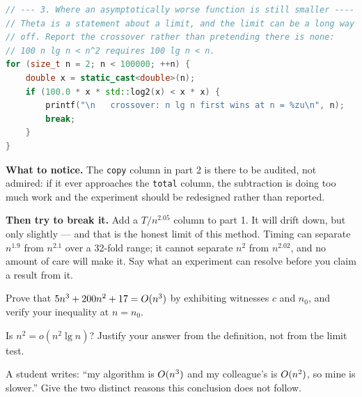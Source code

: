 \begin{lab}
\begin{lstlisting}[language=C++]
// --- 3. Where an asymptotically worse function is still smaller ----
// Theta is a statement about a limit, and the limit can be a long way
// off. Report the crossover rather than pretending there is none:
// 100 n lg n < n^2 requires 100 lg n < n.
for (size_t n = 2; n < 100000; ++n) {
    double x = static_cast<double>(n);
    if (100.0 * x * std::log2(x) < x * x) {
        printf("\n   crossover: n lg n first wins at n = %zu\n", n);
        break;
    }
}
\end{lstlisting}

\textbf{What to notice.} The \texttt{copy} column in part 2 is there to be
audited, not admired: if it ever approaches the \texttt{total} column, the
subtraction is doing too much work and the experiment should be redesigned
rather than reported.

\smallskip
\textbf{Then try to break it.} Add a $T/n^{2.05}$ column to part 1. It will
drift down, but only slightly --- and that is the honest limit of this method.
Timing can separate $n^{1.9}$ from $n^{2.1}$ over a 32-fold range; it cannot
separate $n^{2}$ from $n^{2.02}$, and no amount of care will make it. Say what
an experiment can resolve before you claim a result from it.
\end{lab}

\begin{checkpoint}
\begin{tightnum}
  \item Prove that $5n^{3} + 200n^{2} + 17 = O(n^{3})$ by exhibiting
        witnesses $c$ and $n_{0}$, and verify your inequality at $n = n_{0}$.
  \item Is $n^{2} = o(n^{2}\lg n)$? Justify your answer from the definition,
        not from the limit test.
  \item A student writes: ``my algorithm is $O(n^{3})$ and my colleague's is
        $O(n^{2})$, so mine is slower.'' Give the two distinct reasons this
        conclusion does not follow.
\end{tightnum}
\end{checkpoint}

